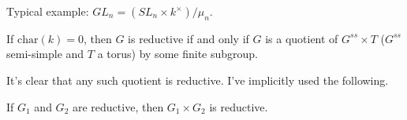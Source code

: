 Typical example: $GL_n=(SL_n\times k^\times)/\mu_n$.

\begin{theorem}
 If $\mathrm{char}(k)=0$, then $G$ is reductive if and only if $G$ is a quotient of $G^{ss}\times T$ ($G^{ss}$ semi-simple and $T$ a torus) by some finite subgroup.
\end{theorem}
It's clear that any such quotient is reductive. I've implicitly used the following.
\begin{exercise}
 If $G_1$ and $G_2$ are reductive, then $G_1\times G_2$ is reductive.
\end{exercise}
